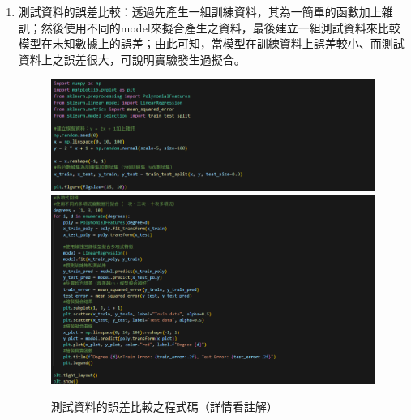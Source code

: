 \documentclass[12pt,a4paper]{article}
\begin{document}
\begin{CJK}{UTF8}{bkai}
\begin{itemize}
\begin{enumerate}
        \item 測試資料的誤差比較：透過先產生一組訓練資料，其為一簡單的函數加上雜訊；然後使用不同的model來擬合產生之資料，最後建立一組測試資料來比較模型在未知數據上的誤差；由此可知，當模型在訓練資料上誤差較小、而測試資料上之誤差很大，可說明實驗發生過擬合。
        \begin{figure}[h]
            \centering
            \includegraphics[width=1\linewidth]{figures/code/practice_1/practice_QA2.png}          \includegraphics[width=1\linewidth]{figures/code/practice_1/practice_QA3.png}
            \caption{測試資料的誤差比較之程式碼（詳情看註解）}
            \label{fig:practice_design}
        \end{figure}
        
        \clearpage
        

\end{enumerate}
\end{itemize}
\end{CJK}
\end{document}
